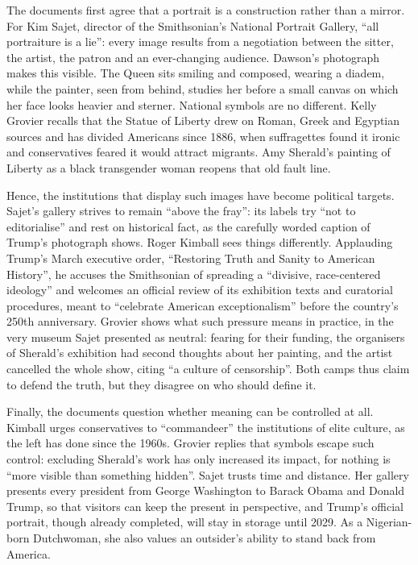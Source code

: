 \documentclass[11pt,a4paper]{article}
\begin{document}
The documents first agree that a portrait is a construction rather than a mirror. For Kim Sajet, director of the Smithsonian's National Portrait Gallery, ``all portraiture is a lie'': every image results from a negotiation between the sitter, the artist, the patron and an ever-changing audience. Dawson's photograph makes this visible. The Queen sits smiling and composed, wearing a diadem, while the painter, seen from behind, studies her before a small canvas on which her face looks heavier and sterner. National symbols are no different. Kelly Grovier recalls that the Statue of Liberty drew on Roman, Greek and Egyptian sources and has divided Americans since 1886, when suffragettes found it ironic and conservatives feared it would attract migrants. Amy Sherald's painting of Liberty as a black transgender woman reopens that old fault line.

Hence, the institutions that display such images have become political targets. Sajet's gallery strives to remain ``above the fray'': its labels try ``not to editorialise'' and rest on historical fact, as the carefully worded caption of Trump's photograph shows. Roger Kimball sees things differently. Applauding Trump's March executive order, ``Restoring Truth and Sanity to American History'', he accuses the Smithsonian of spreading a ``divisive, race-centered ideology'' and welcomes an official review of its exhibition texts and curatorial procedures, meant to ``celebrate American exceptionalism'' before the country's 250th anniversary. Grovier shows what such pressure means in practice, in the very museum Sajet presented as neutral: fearing for their funding, the organisers of Sherald's exhibition had second thoughts about her painting, and the artist cancelled the whole show, citing ``a culture of censorship''. Both camps thus claim to defend the truth, but they disagree on who should define it.

Finally, the documents question whether meaning can be controlled at all. Kimball urges conservatives to ``commandeer'' the institutions of elite culture, as the left has done since the 1960s. Grovier replies that symbols escape such control: excluding Sherald's work has only increased its impact, for nothing is ``more visible than something hidden''. Sajet trusts time and distance. Her gallery presents every president from George Washington to Barack Obama and Donald Trump, so that visitors can keep the present in perspective, and Trump's official portrait, though already completed, will stay in storage until 2029. As a Nigerian-born Dutchwoman, she also values an outsider's ability to stand back from America.
\end{document}
